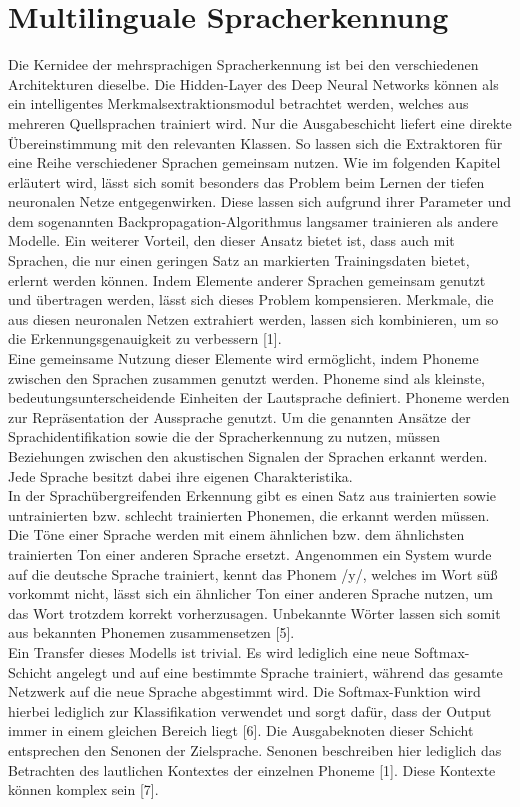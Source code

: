 \section{Multilinguale Spracherkennung}
Die Kernidee der mehrsprachigen Spracherkennung ist bei den verschiedenen Architekturen dieselbe. Die Hidden-Layer des Deep Neural Networks können als ein intelligentes Merkmalsextraktionsmodul betrachtet werden, welches aus mehreren Quellsprachen trainiert wird. Nur die Ausgabeschicht liefert eine direkte Übereinstimmung mit den relevanten Klassen. So lassen sich die Extraktoren für eine Reihe verschiedener Sprachen gemeinsam nutzen. 
Wie im folgenden Kapitel erläutert wird, lässt sich somit besonders das Problem beim Lernen der tiefen neuronalen Netze entgegenwirken. Diese lassen sich aufgrund ihrer Parameter und dem sogenannten Backpropagation-Algorithmus langsamer trainieren als andere Modelle. Ein weiterer Vorteil, den dieser Ansatz bietet ist, dass auch mit Sprachen, die nur einen geringen Satz an markierten Trainingsdaten bietet, erlernt werden können. Indem Elemente anderer Sprachen gemeinsam genutzt und übertragen werden, lässt sich dieses Problem kompensieren. Merkmale, die aus diesen neuronalen Netzen extrahiert werden, lassen sich kombinieren, um so die Erkennungsgenauigkeit zu verbessern [1].
\\
Eine gemeinsame Nutzung dieser Elemente wird ermöglicht, indem Phoneme zwischen den Sprachen zusammen genutzt werden. Phoneme sind als kleinste, bedeutungsunterscheidende Einheiten der Lautsprache definiert. Phoneme werden zur Repräsentation der Aussprache genutzt. Um die genannten Ansätze der Sprachidentifikation sowie die der Spracherkennung zu nutzen, müssen Beziehungen zwischen den akustischen Signalen der Sprachen erkannt werden. Jede Sprache besitzt dabei ihre eigenen Charakteristika. 
\\
In der Sprachübergreifenden Erkennung gibt es einen Satz aus trainierten sowie untrainierten bzw. schlecht trainierten Phonemen, die erkannt werden müssen. Die Töne einer Sprache werden mit einem ähnlichen bzw. dem ähnlichsten trainierten Ton einer anderen Sprache ersetzt. Angenommen ein System wurde auf die deutsche Sprache trainiert, kennt das Phonem /y/, welches im Wort süß vorkommt nicht, lässt sich ein ähnlicher Ton einer anderen Sprache nutzen, um das Wort trotzdem korrekt vorherzusagen. Unbekannte Wörter lassen sich somit aus bekannten Phonemen zusammensetzen [5]. 
\\
Ein Transfer dieses Modells ist trivial. Es wird lediglich eine neue Softmax-Schicht angelegt und auf eine bestimmte Sprache trainiert, während das gesamte Netzwerk auf die neue Sprache abgestimmt wird. Die Softmax-Funktion wird hierbei lediglich zur Klassifikation verwendet und sorgt dafür, dass der Output immer in einem gleichen Bereich liegt [6]. Die Ausgabeknoten dieser Schicht entsprechen den Senonen der Zielsprache. Senonen beschreiben hier lediglich das Betrachten des lautlichen Kontextes der einzelnen Phoneme [1]. Diese Kontexte können komplex sein [7].
